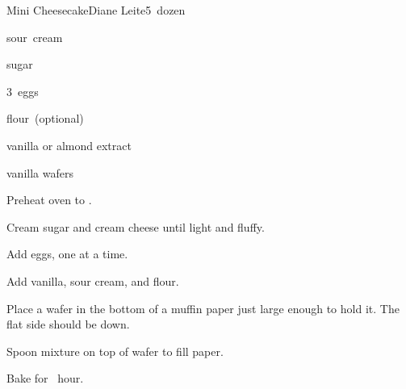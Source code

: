 \begin{recipe}{Mini Cheesecake}{Diane Leite}{5~dozen}

\begin{ingredients}
\item {} 
\item {} sour~cream
\item {} sugar
\item 3~eggs
\item {} flour~(optional)
\item {} vanilla or almond extract
\item vanilla wafers
\end{ingredients}

\begin{directions}
\item Preheat oven to .
\item Cream sugar and cream cheese until light and fluffy.
\item Add eggs, one at a time.
\item Add vanilla, sour cream, and flour.
\item Place a wafer in the bottom of a muffin paper just large enough to hold it. The flat side should be down.
\item Spoon mixture on top of wafer to fill paper.
\item Bake for \half~hour.
\end{directions}

\end{recipe}
